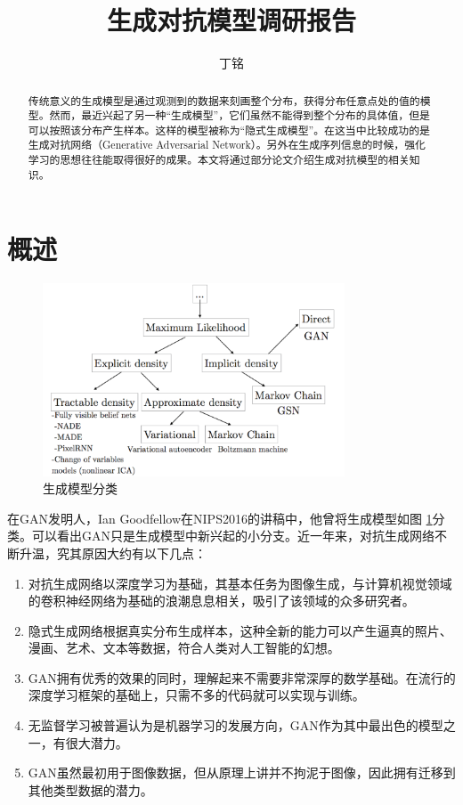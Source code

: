 \documentclass[a4paper]{article}
\title{生成对抗模型调研报告}
\author{丁铭}
\begin{document}
\maketitle

\begin{abstract}
传统意义的生成模型是通过观测到的数据来刻画整个分布，获得分布任意点处的值的模型。然而，最近兴起了另一种“生成模型”，它们虽然不能得到整个分布的具体值，但是可以按照该分布产生样本。这样的模型被称为“隐式生成模型”。在这当中比较成功的是生成对抗网络（Generative Adversarial Network）。另外在生成序列信息的时候，强化学习的思想往往能取得很好的成果。本文将通过部分论文介绍生成对抗模型的相关知识。
\end{abstract}
\tableofcontents
\newpage
\section{概述}
\begin{figure}\centering
\includegraphics[width=0.8\textwidth]{./img/1.png}
\caption{生成模型分类}
\label{fig:taxonomy}
\end{figure}
在GAN发明人，Ian Goodfellow在NIPS2016的讲稿\cite{gan_tutorial}中，他曾将生成模型如图 \ref{fig:taxonomy}分类。可以看出GAN只是生成模型中新兴起的小分支。近一年来，对抗生成网络不断升温，究其原因大约有以下几点：
\begin{enumerate}
\item 对抗生成网络以深度学习为基础，其基本任务为图像生成，与计算机视觉领域的卷积神经网络为基础的浪潮息息相关，吸引了该领域的众多研究者。
\item 隐式生成网络根据真实分布生成样本，这种全新的能力可以产生逼真的照片、漫画、艺术、文本等数据，符合人类对人工智能的幻想。
\item GAN拥有优秀的效果的同时，理解起来不需要非常深厚的数学基础。在流行的深度学习框架的基础上，只需不多的代码就可以实现与训练。
\item 无监督学习被普遍认为是机器学习的发展方向，GAN作为其中最出色的模型之一，有很大潜力。
\item GAN虽然最初用于图像数据，但从原理上讲并不拘泥于图像，因此拥有迁移到其他类型数据的潜力。
\end{enumerate}
\end{document}
